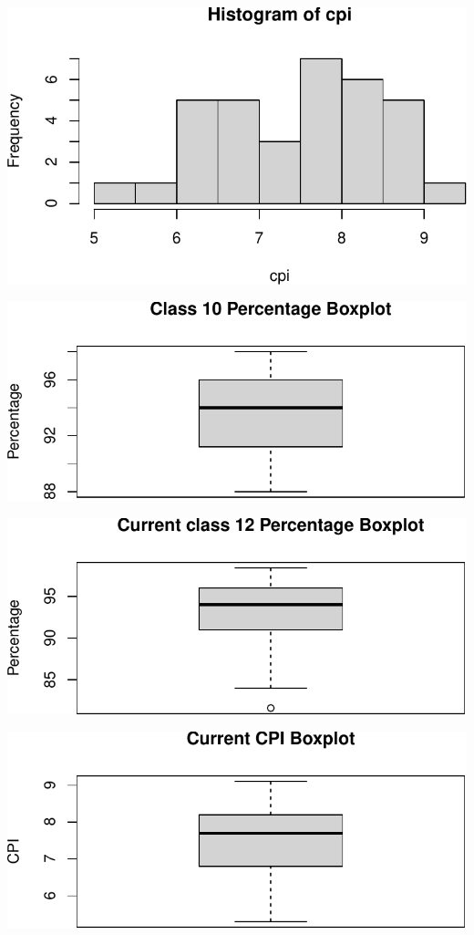 \documentclass[
  letterpaper,
  DIV=11,
  numbers=noendperiod]{scrartcl}
\begin{document}
\includegraphics{Question1_files/figure-pdf/unnamed-chunk-4-1.pdf}

\includegraphics{Question1_files/figure-pdf/unnamed-chunk-5-1.pdf}

\includegraphics{Question1_files/figure-pdf/unnamed-chunk-6-1.pdf}

\includegraphics{Question1_files/figure-pdf/unnamed-chunk-7-1.pdf}
\end{document}
